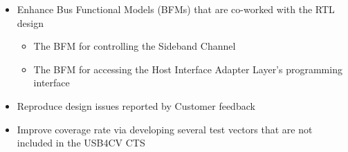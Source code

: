 \documentclass{cvclass}
\begin{document}
{\begin{itemize}
\begin{itemize}
\begin{itemize}
\begin{itemize}
                \end{itemize}
            \end{itemize}
            \item Enhance Bus Functional Models (BFMs) that are co-worked with the RTL design
            \begin{itemize}
                \item The BFM for controlling the Sideband Channel
                \item The BFM for accessing the Host Interface Adapter Layer's programming interface
            \end{itemize}
            \item Reproduce design issues reported by Customer feedback
            \item Improve coverage rate via developing several test vectors that are not included in the USB4CV CTS
        \end{itemize}
    \end{itemize}}
\end{document}
